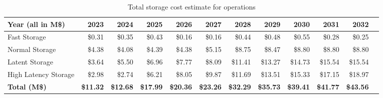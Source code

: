 \tiny \begin{longtable} { |p{}  |r  |r  |r  |r  |r  |r  |r  |r  |r  |r  |r |} 
\caption{Total storage cost estimate for operations \label{tab:opsStorageCost}}\\ 
\hline 
\textbf{Year (all in M\$)}&\textbf{2023}&\textbf{2024}&\textbf{2025}&\textbf{2026}&\textbf{2027}&\textbf{2028}&\textbf{2029}&\textbf{2030}&\textbf{2031}&\textbf{2032} \\ \hline
{Fast Storage}&{\$0.31}&{\$0.35}&{\$0.43}&{\$0.16}&{\$0.16}&{\$0.44}&{\$0.48}&{\$0.55}&{\$0.28}&{\$0.25} \\ \hline
{Normal Storage}&{\$4.38}&{\$4.08}&{\$4.39}&{\$4.38}&{\$5.15}&{\$8.75}&{\$8.47}&{\$8.80}&{\$8.80}&{\$8.80} \\ \hline
{Latent Storage}&{\$3.64}&{\$5.50}&{\$6.96}&{\$7.77}&{\$8.09}&{\$11.41}&{\$13.27}&{\$14.73}&{\$15.54}&{\$15.54} \\ \hline
{High Latency Storage}&{\$2.98}&{\$2.74}&{\$6.21}&{\$8.05}&{\$9.87}&{\$11.69}&{\$13.51}&{\$15.33}&{\$17.15}&{\$18.97} \\ \hline
\textbf{Total (M\$)}&\textbf{\$11.32}&\textbf{\$12.68}&\textbf{\$17.99}&\textbf{\$20.36}&\textbf{\$23.26}&\textbf{\$32.29}&\textbf{\$35.73}&\textbf{\$39.41}&\textbf{\$41.77}&\textbf{\$43.56} \\ \hline
\end{longtable} \normalsize

